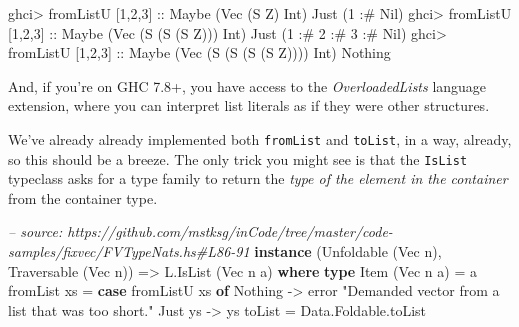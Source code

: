 \documentclass[]{article}
\newenvironment{Shaded}{\begin{snugshade}}{\end{snugshade}}
\newcommand{\CommentTok}[1]{\textcolor[rgb]{0.56,0.35,0.01}{\textit{#1}}}
\newcommand{\DataTypeTok}[1]{\textcolor[rgb]{0.13,0.29,0.53}{#1}}
\newcommand{\DecValTok}[1]{\textcolor[rgb]{0.00,0.00,0.81}{#1}}
\newcommand{\FunctionTok}[1]{\textcolor[rgb]{0.00,0.00,0.00}{#1}}
\newcommand{\KeywordTok}[1]{\textcolor[rgb]{0.13,0.29,0.53}{\textbf{#1}}}
\newcommand{\NormalTok}[1]{#1}
\newcommand{\OtherTok}[1]{\textcolor[rgb]{0.56,0.35,0.01}{#1}}
\newcommand{\StringTok}[1]{\textcolor[rgb]{0.31,0.60,0.02}{#1}}
\begin{document}
\begin{Shaded}
\begin{Highlighting}[]
\NormalTok{ghci}\FunctionTok{>}\NormalTok{ fromListU [}\DecValTok{1}\NormalTok{,}\DecValTok{2}\NormalTok{,}\DecValTok{3}\NormalTok{]}\OtherTok{ ::} \DataTypeTok{Maybe}\NormalTok{ (}\DataTypeTok{Vec}\NormalTok{ (}\DataTypeTok{S} \DataTypeTok{Z}\NormalTok{) }\DataTypeTok{Int}\NormalTok{)}
\DataTypeTok{Just}\NormalTok{ (}\DecValTok{1} \FunctionTok{:#} \DataTypeTok{Nil}\NormalTok{)}
\NormalTok{ghci}\FunctionTok{>}\NormalTok{ fromListU [}\DecValTok{1}\NormalTok{,}\DecValTok{2}\NormalTok{,}\DecValTok{3}\NormalTok{]}\OtherTok{ ::} \DataTypeTok{Maybe}\NormalTok{ (}\DataTypeTok{Vec}\NormalTok{ (}\DataTypeTok{S}\NormalTok{ (}\DataTypeTok{S}\NormalTok{ (}\DataTypeTok{S} \DataTypeTok{Z}\NormalTok{))) }\DataTypeTok{Int}\NormalTok{)}
\DataTypeTok{Just}\NormalTok{ (}\DecValTok{1} \FunctionTok{:#} \DecValTok{2} \FunctionTok{:#} \DecValTok{3} \FunctionTok{:#} \DataTypeTok{Nil}\NormalTok{)}
\NormalTok{ghci}\FunctionTok{>}\NormalTok{ fromListU [}\DecValTok{1}\NormalTok{,}\DecValTok{2}\NormalTok{,}\DecValTok{3}\NormalTok{]}\OtherTok{ ::} \DataTypeTok{Maybe}\NormalTok{ (}\DataTypeTok{Vec}\NormalTok{ (}\DataTypeTok{S}\NormalTok{ (}\DataTypeTok{S}\NormalTok{ (}\DataTypeTok{S}\NormalTok{ (}\DataTypeTok{S} \DataTypeTok{Z}\NormalTok{)))) }\DataTypeTok{Int}\NormalTok{)}
\DataTypeTok{Nothing}
\end{Highlighting}
\end{Shaded}

And, if you're on GHC 7.8+, you have access to the \emph{OverloadedLists}
language extension, where you can interpret list literals as if they were other
structures.

We've already already implemented both \texttt{fromList} and \texttt{toList}, in
a way, already, so this should be a breeze. The only trick you might see is that
the \texttt{IsList} typeclass asks for a type family to return the \emph{type of
the element in the container} from the container type.

\begin{Shaded}
\begin{Highlighting}[]
\CommentTok{-- source: https://github.com/mstksg/inCode/tree/master/code-samples/fixvec/FVTypeNats.hs#L86-91}
\KeywordTok{instance}\NormalTok{ (}\DataTypeTok{Unfoldable}\NormalTok{ (}\DataTypeTok{Vec}\NormalTok{ n), }\DataTypeTok{Traversable}\NormalTok{ (}\DataTypeTok{Vec}\NormalTok{ n)) }\OtherTok{=>} \DataTypeTok{L.IsList}\NormalTok{ (}\DataTypeTok{Vec}\NormalTok{ n a) }\KeywordTok{where}
    \KeywordTok{type} \DataTypeTok{Item}\NormalTok{ (}\DataTypeTok{Vec}\NormalTok{ n a) }\FunctionTok{=}\NormalTok{ a}
\NormalTok{    fromList xs }\FunctionTok{=} \KeywordTok{case}\NormalTok{ fromListU xs }\KeywordTok{of}
                    \DataTypeTok{Nothing} \OtherTok{->}\NormalTok{ error }\StringTok{"Demanded vector from a list that was too short."}
                    \DataTypeTok{Just}\NormalTok{ ys }\OtherTok{->}\NormalTok{ ys}
\NormalTok{    toList      }\FunctionTok{=}\NormalTok{ Data.Foldable.toList}
\end{Highlighting}
\end{Shaded}
\end{document}
